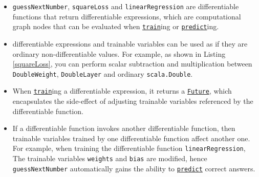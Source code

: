 \begin{itemize}
  \item \lstinline{guessNextNumber}, \lstinline{squareLoss} and \lstinline{linearRegression} are \glspl{differentiable function} that return \glspl{differentiable expression}, which are computational graph nodes that can be evaluated when \href{https://javadoc.io/page/com.thoughtworks.deeplearning/deeplearning_2.11/latest/com/thoughtworks/deeplearning/DeepLearning.html\#train(differentiable:Differentiable)(implicitmonoid:algebra.ring.MultiplicativeMonoid[DeepLearning.this.Delta]):com.thoughtworks.future.Future[DeepLearning.this.Data]}{\lstinline{train}}ing or \href{https://javadoc.io/page/com.thoughtworks.deeplearning/deeplearning_2.11/latest/com/thoughtworks/deeplearning/DeepLearning.html\#predict(differentiable:Differentiable):com.thoughtworks.future.Future[DeepLearning.this.Data]}{\lstinline{predict}}ing.
  \item \Glspl{differentiable expression} and \glspl{trainable variable} can be used as if they are ordinary non-differentiable values. For example, as shown in Listing \ref{squareLoss}, you can perform scalar subtraction and multiplication between \lstinline{DoubleWeight}, \lstinline{DoubleLayer} and ordinary \lstinline{scala.Double}.
  \item When \href{https://javadoc.io/page/com.thoughtworks.deeplearning/deeplearning_2.11/latest/com/thoughtworks/deeplearning/DeepLearning.html\#train(differentiable:Differentiable)(implicitmonoid:algebra.ring.MultiplicativeMonoid[DeepLearning.this.Delta]):com.thoughtworks.future.Future[DeepLearning.this.Data]}{\lstinline{train}}ing a \gls{differentiable expression}, it returns a \href{https://javadoc.io/page/com.thoughtworks.future/future_2.11/latest/com/thoughtworks/future$$Future.html}{\lstinline{Future}}, which encapsulates the side-effect of adjusting \glspl{trainable variable} referenced by the \gls{differentiable function}.
  \item If a \gls{differentiable function} invokes another \gls{differentiable function}, then \glspl{trainable variable} trained by one \gls{differentiable function} affect another one. For example, when training the \gls{differentiable function} \lstinline{linearRegression}, The \glspl{trainable variable} \lstinline{weights} and \lstinline{bias} are modified, hence \lstinline{guessNextNumber} automatically gains the ability to \href{https://javadoc.io/page/com.thoughtworks.deeplearning/deeplearning_2.11/latest/com/thoughtworks/deeplearning/DeepLearning.html\#predict(differentiable:Differentiable):com.thoughtworks.future.Future[DeepLearning.this.Data]}{\lstinline{predict}} correct answers.
\end{itemize}

